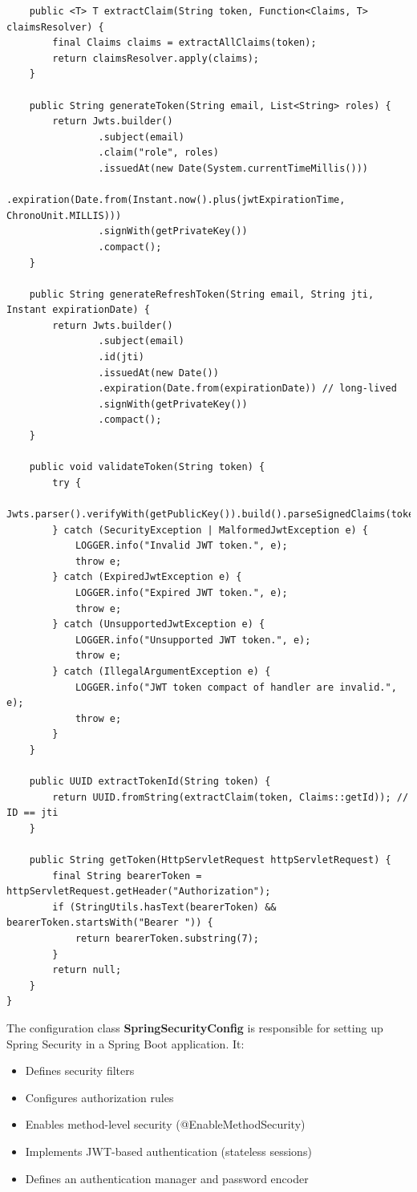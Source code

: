\begin{lstlisting}
    public <T> T extractClaim(String token, Function<Claims, T> claimsResolver) {
        final Claims claims = extractAllClaims(token);
        return claimsResolver.apply(claims);
    }

    public String generateToken(String email, List<String> roles) {
        return Jwts.builder()
                .subject(email)
                .claim("role", roles)
                .issuedAt(new Date(System.currentTimeMillis()))
                .expiration(Date.from(Instant.now().plus(jwtExpirationTime, ChronoUnit.MILLIS)))
                .signWith(getPrivateKey())
                .compact();
    }

    public String generateRefreshToken(String email, String jti, Instant expirationDate) {
        return Jwts.builder()
                .subject(email)
                .id(jti)
                .issuedAt(new Date())
                .expiration(Date.from(expirationDate)) // long-lived
                .signWith(getPrivateKey())
                .compact();
    }

    public void validateToken(String token) {
        try {
            Jwts.parser().verifyWith(getPublicKey()).build().parseSignedClaims(token);
        } catch (SecurityException | MalformedJwtException e) {
            LOGGER.info("Invalid JWT token.", e);
            throw e;
        } catch (ExpiredJwtException e) {
            LOGGER.info("Expired JWT token.", e);
            throw e;
        } catch (UnsupportedJwtException e) {
            LOGGER.info("Unsupported JWT token.", e);
            throw e;
        } catch (IllegalArgumentException e) {
            LOGGER.info("JWT token compact of handler are invalid.", e);
            throw e;
        }
    }

    public UUID extractTokenId(String token) {
        return UUID.fromString(extractClaim(token, Claims::getId)); // ID == jti
    }

    public String getToken(HttpServletRequest httpServletRequest) {
        final String bearerToken = httpServletRequest.getHeader("Authorization");
        if (StringUtils.hasText(bearerToken) && bearerToken.startsWith("Bearer ")) {
            return bearerToken.substring(7);
        }
        return null;
    }
}
\end{lstlisting}

The configuration class  \textbf{SpringSecurityConfig} is responsible for setting up Spring Security in a Spring Boot application. It:
\begin{itemize}
\item Defines security filters
\item Configures authorization rules
\item Enables method-level security (@EnableMethodSecurity)
\item Implements JWT-based authentication (stateless sessions)
\item Defines an authentication manager and password encoder
\end{itemize}


